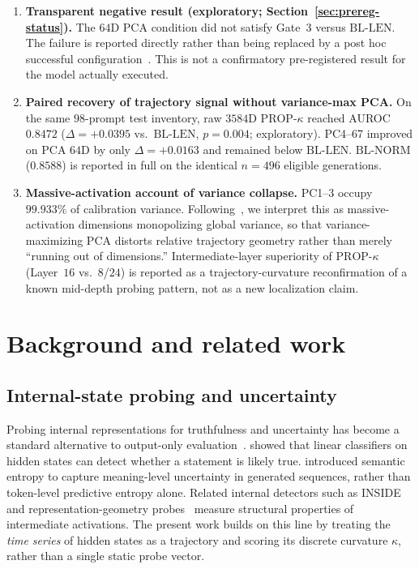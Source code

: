 \documentclass{article}
\newcommand{\propk}{\mathrm{PROP}\text{-}\kappa}
\newcommand{\bllen}{\mathrm{BL\text{-}LEN}}
\newcommand{\blnorm}{\mathrm{BL\text{-}NORM}}
\begin{document}
\begin{enumerate}[leftmargin=1.4em,itemsep=2pt]
\item \textbf{Transparent negative result (exploratory; Section~\ref{sec:prereg-status}).}
The $64${D} {PCA} condition did not satisfy Gate~3 versus $\bllen$. The failure is reported directly rather than being replaced by a post hoc successful configuration~\citep{simmons2011false,nosek2018prereg}. This is not a confirmatory pre-registered result for the model actually executed.

\item \textbf{Paired recovery of trajectory signal without variance-max {PCA}.}
On the same $98$-prompt test inventory, raw $3584${D} $\propk$ reached {AUROC} $0.8472$ ($\Delta=+0.0395$ vs.\ $\bllen$, $p=0.004$; exploratory). {PC4}--{67} improved on {PCA} $64${D} by only $\Delta=+0.0163$ and remained below $\bllen$. $\blnorm$ ($0.8588$) is reported in full on the identical $n=496$ eligible generations.

\item \textbf{Massive-activation account of variance collapse.}
{PC1}--{3} occupy $99.933\%$ of calibration variance. Following~\citet{sun2024massive}, we interpret this as massive-activation dimensions monopolizing global variance, so that variance-maximizing {PCA} distorts relative trajectory geometry rather than merely ``running out of dimensions.'' Intermediate-layer superiority of $\propk$ (Layer~$16$ vs.\ $8$/$24$) is reported as a trajectory-curvature reconfirmation of a known mid-depth probing pattern, not as a new localization claim.
\end{enumerate}

\section{Background and related work}
\label{sec:bg}

\subsection{Internal-state probing and uncertainty}
\label{sec:rw-probe}

Probing internal representations for truthfulness and uncertainty has become a standard alternative to output-only evaluation~\citep{belinkov2019,alain2017probes,zou2023repeng}.
\citet{azaria2023internal} showed that linear classifiers on hidden states can detect whether a statement is likely true.
\citet{farquhar2024semantic} introduced semantic entropy to capture meaning-level uncertainty in generated sequences, rather than token-level predictive entropy alone.
Related internal detectors such as {INSIDE}~\citep{chen2024inside} and representation-geometry probes~\citep{orgad2024llms,marks2024geometry} measure structural properties of intermediate activations.
The present work builds on this line by treating the \emph{time series} of hidden states as a trajectory and scoring its discrete curvature $\kappa$, rather than a single static probe vector.
\end{document}
